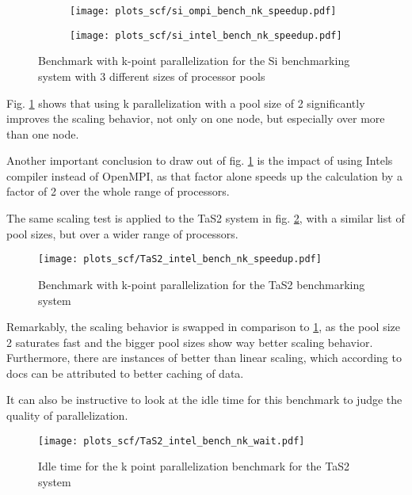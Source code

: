 \documentclass[main.tex]{subfiles}
\begin{document}
\begin{figure}[ht!]
\begin{subfigure}[b]{0.49\textwidth}
    \centering
    \texttt{[image: plots\_scf/si\_ompi\_bench\_nk\_speedup.pdf]}
\end{subfigure}
\begin{subfigure}[b]{0.49\textwidth}
    \centering
    \texttt{[image: plots\_scf/si\_intel\_bench\_nk\_speedup.pdf]}
\end{subfigure}
\caption{Benchmark with k-point parallelization for the Si benchmarking system with 3 different sizes of processor pools}
\label{fig:scaling_nk_si}
\end{figure}

Fig. \ref{fig:scaling_nk_si} shows that using k parallelization with a pool size of 2 significantly improves the scaling behavior, not only on one node, but especially over more than one node.


Another important conclusion to draw out of fig. \ref{fig:scaling_nk_si} is the impact of using Intels compiler instead of OpenMPI, as that factor alone speeds up the calculation by a factor of 2 over the whole range of processors.

The same scaling test is applied to the TaS2 system in fig. \ref{fig:scaling_nk_tas2}, with a similar list of pool sizes, but over a wider range of processors.

\begin{figure}[ht!]
    \centering
    \texttt{[image: plots\_scf/TaS2\_intel\_bench\_nk\_speedup.pdf]}
    \caption{Benchmark with k-point parallelization for the TaS2 benchmarking system}
    \label{fig:scaling_nk_tas2}
\end{figure}

Remarkably, the scaling behavior is swapped in comparison to \ref{fig:scaling_nk_si}, as the pool size 2 saturates fast and the bigger pool sizes show way better scaling behavior.
Furthermore, there are instances of better than linear scaling, which according to \QE docs can be attributed to better caching of data.

It can also be instructive to look at the idle time for this benchmark to judge the quality of parallelization. 

\begin{figure}[ht!]
    \centering
    \texttt{[image: plots\_scf/TaS2\_intel\_bench\_nk\_wait.pdf]}
    \caption{Idle time for the k point parallelization benchmark for the TaS2 system}
    \label{fig:scaling_nk_tas2_wait}
\end{figure}
\end{document}
